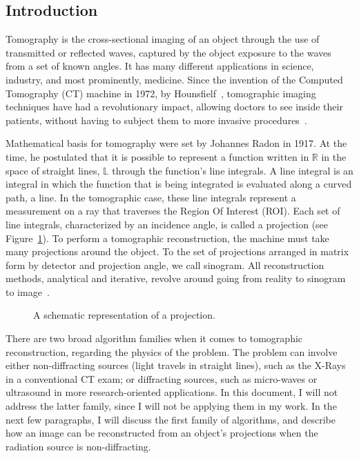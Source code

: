 \subsection{Introduction}%
\label{sub:introduction}

Tomography is the cross-sectional imaging of an object through the use
of transmitted or reflected waves, captured by the object exposure to
the waves from a set of known angles. It has many different applications
in science, industry, and most prominently, medicine. Since the
invention of the Computed Tomography (\gls{CT}) machine in 1972, by
Hounsfielf~\cite{Gunderman2006}, tomographic imaging techniques have had
a revolutionary impact, allowing doctors to see inside their patients,
without having to subject them to more invasive
procedures~\cite{Kak2001a}.

Mathematical basis for tomography were set by Johannes Radon in 1917. At
the time, he postulated that  it is possible to represent a function
written in $\mathbb{R}$ in the space of straight lines, $\mathbb{L}$
through the function's line integrals. A line integral is an integral in
which the function that is being integrated is evaluated along a curved
path, a line. In the tomographic case, these line integrals represent a
measurement on a ray that traverses the Region Of Interest (\gls{ROI}).
Each set of line integrals, characterized by an incidence angle, is
called a projection (see Figure~\ref{fig:projection}). To perform a
tomographic reconstruction, the machine must take many projections
around the object. To the set of projections arranged in matrix form by
detector and projection angle, we call sinogram. All reconstruction
methods, analytical and iterative, revolve around going from reality to
sinogram to image~\cite{Bruyant2002, Kak2001, Herman1973, Herman1995,
Herman2009, Defrise2003}.

\begin{figure}[htpb]
    \centering
    \caption{A schematic representation of a projection.}
    \label{fig:projection}
\end{figure}

There are two broad algorithm families when it comes to tomographic
reconstruction, regarding the physics of the problem. The problem can
involve either non-diffracting sources (light travels in straight
lines), such as the X-Rays in a conventional \gls{CT} exam; or
diffracting sources, such as micro-waves or ultrasound in more
research-oriented applications. In this document, I will not address the
latter family, since I will not be applying them in my work. In the next
few paragraphs, I will discuss the first family of algorithms, and
describe how an image can be reconstructed from an object's projections
when the radiation source is non-diffracting.

